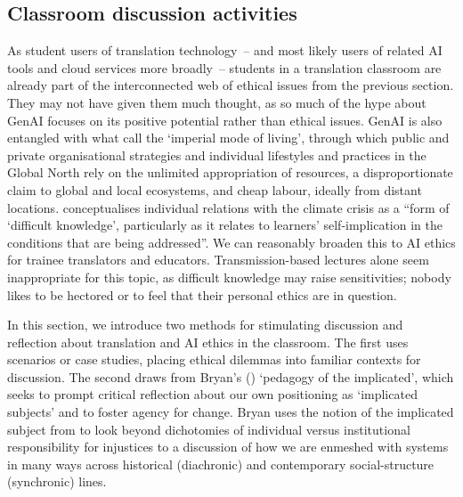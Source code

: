 \documentclass[output=paper]{langscibook}
\begin{document}
\subsection{Classroom discussion activities}
As student users of translation technology~-- and most likely users of related AI tools and cloud services more broadly~-- students in a translation classroom are already part of the interconnected web of ethical issues from the previous section. They may not have given them much thought, as so much of the hype about GenAI focuses on its positive potential rather than ethical issues. GenAI is also entangled with what \citet{brand_wissen_2021} call the ‘imperial mode of living’, through which public and private organisational strategies and individual lifestyles and practices in the Global North rely on the unlimited appropriation of resources, a disproportionate claim to global and local ecosystems, and cheap labour, ideally from distant locations. \citet[330]{bryan_pedagogy_2022} conceptualises individual relations with the climate crisis as a “form of ‘difficult knowledge’, particularly as it relates to learners' self-implication in the conditions that are being addressed”. We can reasonably broaden this to AI ethics for trainee translators and educators. Transmission-based lectures alone seem inappropriate for this topic, as difficult knowledge may raise sensitivities; nobody likes to be hectored or to feel that their personal ethics are in question.

In this section, we introduce two methods for stimulating discussion and reflection about translation and AI ethics in the classroom. The first uses scenarios or case studies, placing ethical dilemmas into familiar contexts for discussion. The second draws from Bryan's (\citeyear{bryan_pedagogy_2022}) ‘pedagogy of the implicated’, which seeks to prompt critical reflection about our own positioning as ‘implicated subjects’ and to foster agency for change. Bryan uses the notion of the implicated subject from \citet{rothberg_implicated_2019} to look beyond dichotomies of individual versus institutional responsibility for injustices to a discussion of how we are enmeshed with systems in many ways across historical (diachronic) and contemporary social-structure (synchronic) lines.
\end{document}
